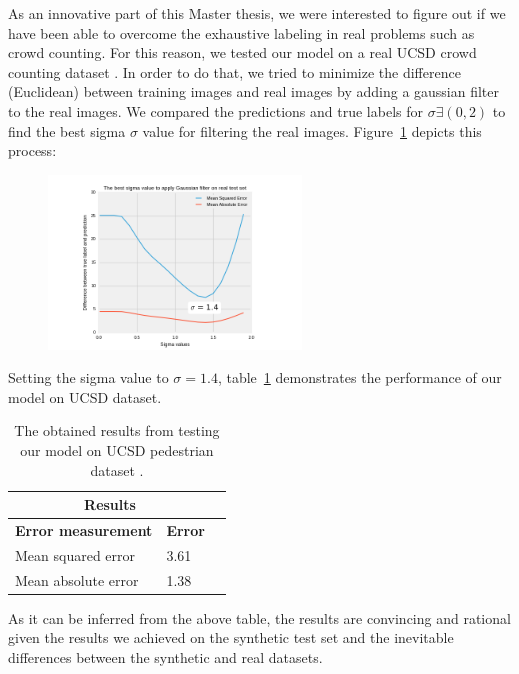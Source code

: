 \noindent As an innovative part of this Master thesis, we were interested to figure out if we have been able to overcome the exhaustive labeling in real problems such as crowd counting. For this reason, we tested our model on a real UCSD crowd counting dataset \cite{chan2008privacy}. In order to do that, we tried to minimize the difference (Euclidean) between training images and real images by adding a gaussian filter to the real images. We compared the predictions and true labels for $\sigma \exists (0,2)$ to find the best sigma $\sigma$ value for filtering the real images. Figure~\ref{sigsig} depicts this process: 


\begin{figure}[H]
	\centering
	{\includegraphics[width=0.6\textwidth]{images/sigmaTest}}
	\caption{}
	\label{sigsig}
\end{figure}

Setting the sigma value to $\sigma = 1.4$, table~\ref{tab:ucsdreal} demonstrates the performance of our model on UCSD dataset.

\begin{table}[H]
\centering
\small\sffamily
\begin{tabular}{llr}
\multicolumn{2}{c}{\textbf{\textbf{Results}}} \\
\bottomrule
\textbf{Error measurement}        & \textbf{Error} \\
\bottomrule
Mean squared error       & 3.61  \\
Mean absolute error      & 1.38  \\
\bottomrule
\end{tabular}
\caption{The obtained results from testing our model on UCSD pedestrian dataset \cite{chan2008privacy}. }
\label{tab:ucsdreal}
\end{table} 

As it can be inferred from the above table, the results are convincing and rational given the results we achieved on the synthetic test set and 
the inevitable differences between the synthetic and real datasets.


